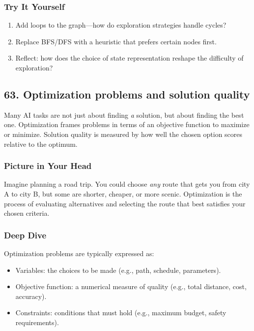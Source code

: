 \documentclass[
  letterpaper,
  DIV=11,
  numbers=noendperiod]{scrreprt}
\providecommand{\tightlist}{%
  \setlength{\itemsep}{0pt}\setlength{\parskip}{0pt}}
\begin{document}
\subsubsection{Try It Yourself}\label{try-it-yourself-61}

\begin{enumerate}
\def\labelenumi{\arabic{enumi}.}
\tightlist
\item
  Add loops to the graph---how do exploration strategies handle cycles?
\item
  Replace BFS/DFS with a heuristic that prefers certain nodes first.
\item
  Reflect: how does the choice of state representation reshape the
  difficulty of exploration?
\end{enumerate}

\subsection{63. Optimization problems and solution
quality}\label{optimization-problems-and-solution-quality}

Many AI tasks are not just about finding \emph{a} solution, but about
finding the best one. Optimization frames problems in terms of an
objective function to maximize or minimize. Solution quality is measured
by how well the chosen option scores relative to the optimum.

\subsubsection{Picture in Your Head}\label{picture-in-your-head-62}

Imagine planning a road trip. You could choose \emph{any} route that
gets you from city A to city B, but some are shorter, cheaper, or more
scenic. Optimization is the process of evaluating alternatives and
selecting the route that best satisfies your chosen criteria.

\subsubsection{Deep Dive}\label{deep-dive-62}

Optimization problems are typically expressed as:

\begin{itemize}
\tightlist
\item
  Variables: the choices to be made (e.g., path, schedule, parameters).
\item
  Objective function: a numerical measure of quality (e.g., total
  distance, cost, accuracy).
\item
  Constraints: conditions that must hold (e.g., maximum budget, safety
  requirements).
\end{itemize}
\end{document}
